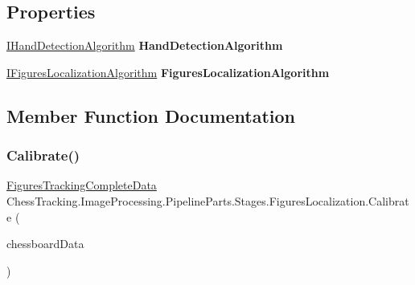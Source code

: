 \subsection*{Properties}
\begin{DoxyCompactItemize}
\item 
\mbox{\label{class_chess_tracking_1_1_image_processing_1_1_pipeline_parts_1_1_stages_1_1_figures_localization_a3346e657bc1f03de97434f4776942416}} 
\mbox{\hyperlink{interface_chess_tracking_1_1_image_processing_1_1_figures_algorithms_1_1_i_hand_detection_algorithm}{I\+Hand\+Detection\+Algorithm}} {\bfseries Hand\+Detection\+Algorithm}
\item 
\mbox{\label{class_chess_tracking_1_1_image_processing_1_1_pipeline_parts_1_1_stages_1_1_figures_localization_a3572d40aad2c55f1457ba491ac5a7c1b}} 
\mbox{\hyperlink{interface_chess_tracking_1_1_image_processing_1_1_figures_algorithms_1_1_i_figures_localization_algorithm}{I\+Figures\+Localization\+Algorithm}} {\bfseries Figures\+Localization\+Algorithm}
\end{DoxyCompactItemize}


\subsection{Member Function Documentation}
\mbox{\label{class_chess_tracking_1_1_image_processing_1_1_pipeline_parts_1_1_stages_1_1_figures_localization_aa4fc69a70edd3ecc04d778972071d491}} 
\subsubsection{\texorpdfstring{Calibrate()}{Calibrate()}}
{\footnotesize\ttfamily \mbox{\hyperlink{class_chess_tracking_1_1_image_processing_1_1_pipeline_data_1_1_figures_tracking_complete_data}{Figures\+Tracking\+Complete\+Data}} Chess\+Tracking.\+Image\+Processing.\+Pipeline\+Parts.\+Stages.\+Figures\+Localization.\+Calibrate (\begin{DoxyParamCaption}\item[{\mbox{\hyperlink{class_chess_tracking_1_1_image_processing_1_1_pipeline_data_1_1_chessboard_tracking_complete_data}{Chessboard\+Tracking\+Complete\+Data}}}]{chessboard\+Data }\end{DoxyParamCaption})}



